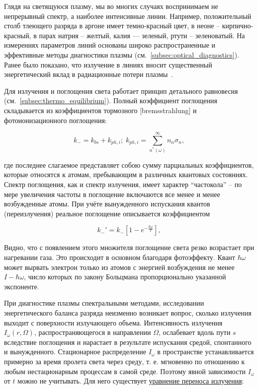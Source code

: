 \documentclass[10pt, a4paper]{article}
\begin{document}
Глядя на светящуюся плазму, мы во многих случаях воспринимаем не непрерывный спектр, а наиболее интенсивные линии. Например, положительный столб тлеющего разряда в аргоне имеет темно-красный цвет, в неоне -- кирпично-красный, в парах натрия -- желтый, калия — зеленый, ртути -- зеленоватый. На измерениях параметров линий основаны широко распространенные и эффективные методы диагностики плазмы (см.~\ref{subsec:optical_diagnostics}). Ранее было показано, что излучение в линиях вносит существенный энергетический вклад в радиационные потери плазмы~\cite{raizer}.

Для излучения и поглощения света работает принцип детального равновесия (см.~\ref{subsec:thermo_equilibrium}). Полный коэффициент поглощения складывается из коэффициентов тормозного [bremsstrahlung] и фотоионизационного поглощения:

\begin{equation*}
	k_{-} = k_{bs}+k_{ph,i};\;k_{ph,i} = \sum\limits_{n^{*}(\omega)}^\infty n_n\sigma_n,
\end{equation*}

где последнее слагаемое представляет собою сумму парциальных коэффициентов, которые относятся к атомам, пребывающим в различных квантовых состояниях. Спектр поглощения, как и спектр излучения, имеет характер ``частокола'' -- по мере увеличения частоты в поглощение включаются все менее и менее возбужденные атомы. При учёте вынужденного испускания квантов (переизлучения) реальное поглощение описывается коэффициентом

\begin{equation*}
	k_{-}' = k_{-}\left[1-e^{-\frac{\hbar\omega}{T}}\right] ,
\end{equation*}

Видно, что с появлением этого множителя поглощение света резко возрастает при нагревании газа. Это происходит в основном благодаря фотоэффекту. Квант $\hbar\omega$ может вырвать электрон только из атомов с энергией возбуждения не менее $I-\hbar\omega$, число которых по закону Больцмана пропорционально указанной
экспоненте.

При диагностике плазмы спектральными методами, исследовании энергетического баланса разряда неизменно возникает вопрос, сколько излучения выходит с поверхности излучающего объема. Интенсивность излучения $I_\omega(r, \Omega)$, распространяющегося в направлении $\Omega$, ослабевает вдоль пути $s$ вследствие поглощения и нарастает в результате испускания средой, спонтанного и вынужденного. Стационарное распределение $I_\omega$ в пространстве устанавливается примерно за время пролета света через среду, т. е. мгновенно по отношению к любым нестационарным процессам в самой среде. Поэтому явной зависимости $I_\omega$ от $t$ можно не учитывать. Для него существует \uline{уравнение переноса излучения}:
\end{document}
